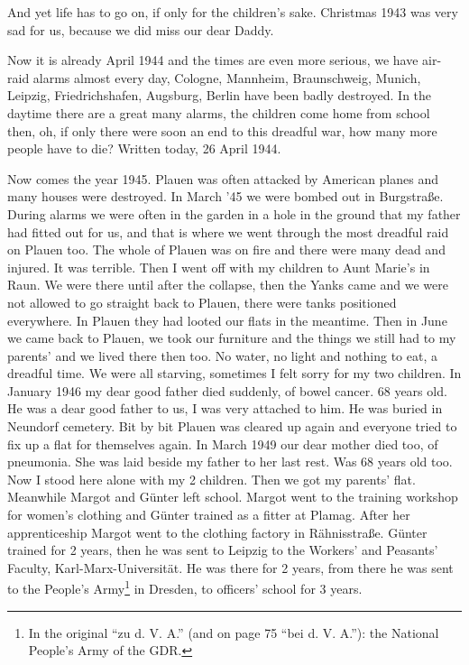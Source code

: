 \documentclass[a5paper,11pt,openany]{book}
\newcommand{\seite}[1]{\leavevmode\marginpar{\footnotesize\itshape\raggedright #1}\ignorespaces}
\begin{document}
\seite{69}
And yet life has to go on, if only for the children's sake.
Christmas 1943 was very sad for us, because we did miss our dear Daddy.

Now it is already April 1944 and the times are even more serious, we have air-raid alarms almost every day,
  Cologne, Mannheim, Braunschweig, Munich, Leipzig, Friedrichshafen, Augsburg, Berlin have been badly destroyed.
In the daytime there are a great many alarms, the children come home from school then,
  oh, if only there were soon
\seite{70}
an end to this dreadful war, how many more people have to die?
Written today, 26 April 1944.

Now comes the year 1945.
Plauen was often attacked by American planes and many houses were destroyed.
In March '45 we were bombed out in Burgstraße.
During alarms we were often in the garden in a hole in the ground that my father had fitted out for us,
  and that is where we went through the most dreadful raid on Plauen too.
The whole of Plauen was
\seite{71}
on fire and there were many dead and injured.
It was terrible.
Then I went off with my children to Aunt Marie's in Raun.
We were there until after the collapse,
  then the Yanks came and we were not allowed to go straight back to Plauen, there were tanks positioned everywhere.
In Plauen they had looted our flats in the meantime.
Then in June we came back to Plauen,
  we took our furniture and the things we still had to my parents' and we lived there then too.
No water,
\seite{72}
no light and nothing to eat, a dreadful time.
We were all starving, sometimes I felt sorry for my two children.
In January 1946 my dear good father died suddenly, of bowel cancer.
68 years old.
He was a dear good father to us, I was very attached to him.
He was buried in Neundorf cemetery.
Bit by bit Plauen was cleared up again and everyone tried to fix up a flat for themselves again.
In March 1949 our dear mother died too, of pneumonia.
She was laid beside my father
\seite{73}
to her last rest.
Was 68 years old too.
Now I stood here alone with my 2 children.
Then we got my parents' flat.
Meanwhile Margot and Günter left school.
Margot went to the training workshop for women's clothing and Günter trained as a fitter at Plamag.
After her apprenticeship Margot went to the clothing factory in Rähnisstraße.
Günter trained for 2 years, then he was sent to Leipzig to the Workers' and Peasants' Faculty, Karl-Marx-Universität.
He was there for 2 years,
\seite{74}
from there he was sent to the People's Army\footnote{In the original ``zu d. V. A.'' (and on page 75 ``bei d. V. A.''): the National People's Army of the GDR.} in Dresden, to officers' school for 3 years.
\end{document}

